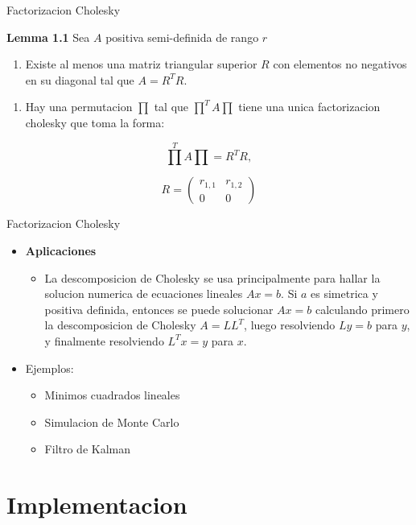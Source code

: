 \documentclass{beamer}
\begin{document}
\begin{frame}{Factorizacion Cholesky}
\begin{block}{\textbf{Lemma 1.1}}
Sea \(A\) positiva semi-definida de rango \(r\)
\end{block}
\begin{enumerate}
\item Existe al menos una matriz triangular superior \(R\) con elementos no negativos en su diagonal tal que \(A = R^TR\).
\end{enumerate} 

\begin{enumerate}
\item Hay una permutacion $\prod$ tal que $\prod^TA\prod$ tiene una unica factorizacion cholesky que toma la forma: 
\end{enumerate}

\begin{equation}
\prod^TA\prod = R^TR ,
\end{equation}

\[
R = 
 \begin{pmatrix}
  r_{1,1} & r_{1,2} \\
  0 & 0
 \end{pmatrix}
\]
\end{frame}

\begin{frame}{Factorizacion Cholesky}
\begin{itemize}
\item \textbf{Aplicaciones}
	\begin{itemize}
		\item La descomposicion de Cholesky se usa principalmente para hallar la solucion numerica de ecuaciones lineales $Ax = b$. Si $a$ es simetrica y positiva definida, entonces se puede solucionar $Ax = b$ calculando primero la descomposicion de Cholesky $A = LL^T$, luego resolviendo $Ly = b$ para $y$, y finalmente resolviendo $L^Tx = y$ para $x$.
	\end{itemize}
\item Ejemplos:
	\begin{itemize}
		\item Minimos cuadrados lineales
		\item Simulacion de Monte Carlo
		\item Filtro de Kalman
	\end{itemize}	 
\end{itemize}
\end{frame}

\section{Implementacion}
\end{document}
